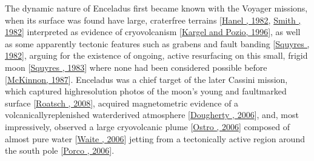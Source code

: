 \documentclass[letterpaper,10pt,english]{jupyterBook}
\begin{document}
\sphinxAtStartPar
The dynamic nature of Enceladus first became known with the Voyager missions, when its surface was found have large, crater\sphinxhyphen{}free terrains {[}\hyperlink{cite.references:id477}{Hanel , 1982}, \hyperlink{cite.references:id488}{Smith , 1982}{]} interpreted as evidence of cryovolcanism {[}\hyperlink{cite.references:id490}{Kargel and Pozio, 1996}{]}, as well as some apparently tectonic features such as grabens and fault banding {[}\hyperlink{cite.references:id441}{Squyres , 1982}{]}, arguing for the existence of ongoing, active resurfacing on this small, frigid moon {[}\hyperlink{cite.references:id475}{Squyres , 1983}{]} where none had been considered possible before {[}\hyperlink{cite.references:id440}{McKinnon, 1987}{]}. Enceladus was a chief target of the later Cassini mission, which captured high\sphinxhyphen{}resolution photos of the moon’s young and fault\sphinxhyphen{}marked surface {[}\hyperlink{cite.references:id483}{Roatsch , 2008}{]}, acquired magnetometric evidence of a volcanically\sphinxhyphen{}replenished water\sphinxhyphen{}derived atmosphere {[}\hyperlink{cite.references:id607}{Dougherty , 2006}{]}, and, most impressively, observed a large cryovolcanic plume {[}\hyperlink{cite.references:id154}{Ostro , 2006}{]} composed of almost pure water {[}\hyperlink{cite.references:id476}{Waite , 2006}{]} jetting from a tectonically active region around the south pole {[}\hyperlink{cite.references:id489}{Porco , 2006}{]}.
\end{document}
